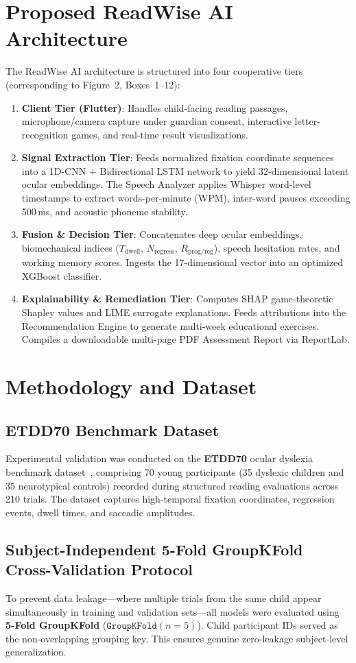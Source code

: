 \documentclass[conference]{IEEEtran}
\begin{document}
\section{Proposed ReadWise AI Architecture}
The ReadWise AI architecture is structured into four cooperative tiers (corresponding to Figure~2, Boxes~1--12):
\begin{enumerate}
    \item \textbf{Client Tier (Flutter)}: Handles child-facing reading passages, microphone/camera capture under guardian consent, interactive letter-recognition games, and real-time result visualizations.
    \item \textbf{Signal Extraction Tier}: Feeds normalized fixation coordinate sequences into a 1D-CNN + Bidirectional LSTM network to yield 32-dimensional latent ocular embeddings. The Speech Analyzer applies Whisper word-level timestamps to extract words-per-minute (WPM), inter-word pauses exceeding 500\,ms, and acoustic phoneme stability.
    \item \textbf{Fusion \& Decision Tier}: Concatenates deep ocular embeddings, biomechanical indices ($T_{\text{dwell}}$, $N_{\text{regress}}$, $R_{\text{prog/reg}}$), speech hesitation rates, and working memory scores. Ingests the 17-dimensional vector into an optimized XGBoost classifier.
    \item \textbf{Explainability \& Remediation Tier}: Computes SHAP game-theoretic Shapley values and LIME surrogate explanations. Feeds attributions into the Recommendation Engine to generate multi-week educational exercises. Compiles a downloadable multi-page PDF Assessment Report via ReportLab.
\end{enumerate}

\section{Methodology and Dataset}
\subsection{ETDD70 Benchmark Dataset}
Experimental validation was conducted on the \textbf{ETDD70} ocular dyslexia benchmark dataset~\cite{prabakar2024}, comprising 70 young participants (35 dyslexic children and 35 neurotypical controls) recorded during structured reading evaluations across 210 trials. The dataset captures high-temporal fixation coordinates, regression events, dwell times, and saccadic amplitudes.

\subsection{Subject-Independent 5-Fold GroupKFold Cross-Validation Protocol}
To prevent data leakage---where multiple trials from the same child appear simultaneously in training and validation sets---all models were evaluated using \textbf{5-Fold GroupKFold} ($\mathtt{GroupKFold}(n=5)$). Child participant IDs served as the non-overlapping grouping key. This ensures genuine zero-leakage subject-level generalization.
\end{document}

